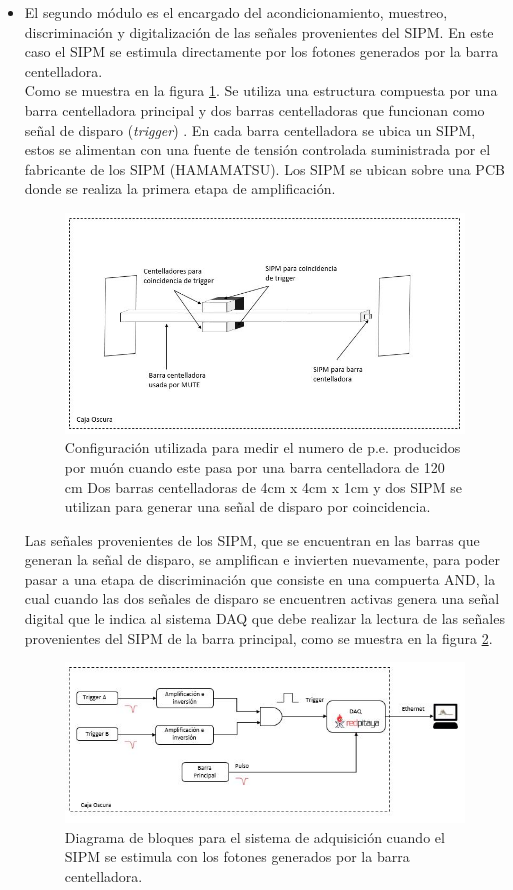 \documentclass[11pt,letterpaper,oneside]{book}
\begin{document}
\begin{itemize}
\item El segundo módulo es el encargado del acondicionamiento, muestreo, discriminación y digitalización de las señales provenientes del SIPM. En este caso el SIPM se estimula directamente por los fotones generados por la barra centelladora.\\
Como se muestra en la figura \ref{Barra}. Se utiliza una estructura compuesta por una barra centelladora principal y dos barras centelladoras que funcionan como señal de disparo (\textit{trigger}) \cite{Muon_detector_Amiga}. En cada barra centelladora se ubica un SIPM, estos se alimentan con una fuente de tensión controlada suministrada por el fabricante de los SIPM (HAMAMATSU). Los SIPM se ubican sobre una PCB donde se realiza la primera etapa de amplificación.\\
\begin{figure}[ht]
  \centering
  	\includegraphics[width=12cm]{Barra.JPG}
  	\caption{Configuración utilizada para medir el numero de p.e. producidos por muón cuando este pasa por una barra centelladora de 120 cm Dos barras centelladoras de 4cm x 4cm x 1cm y dos SIPM se utilizan para generar una señal de disparo por coincidencia.}
	\label{Barra}
\end{figure}
Las señales provenientes de los SIPM, que se encuentran en las barras que generan la señal de disparo, se amplifican e invierten nuevamente, para poder pasar a una etapa de discriminación que consiste en una compuerta AND, la cual cuando las dos señales de disparo se encuentren activas  genera una señal digital que le indica al sistema DAQ que debe realizar la lectura de las señales provenientes del SIPM de la barra principal, como se muestra en la figura \ref{Trigger}. 
\begin{figure}[ht]
  \centering
  	\includegraphics[width=12cm]{Trigger.JPG}
  	\caption{Diagrama de bloques para el sistema de adquisición cuando el SIPM se estimula con los fotones generados por la barra centelladora.}
	\label{Trigger}
\end{figure}


\end{itemize}
\end{document}
